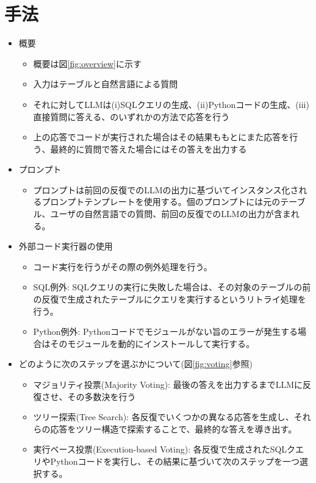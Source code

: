 \documentclass[dvipdfmx,uplatex]{jsarticle}
\theoremstyle{remark}
\newenvironment{method}[1]{
    \begin{tcolorbox}[
        colframe=green!50!black,
        colback=green!50!black!10!white,
        colbacktitle=green!50!black!40!white,
        coltitle=black,
        fonttitle=\bfseries,
        title={#1}
    ]
}{
    \end{tcolorbox}
}
\begin{document}
\section{手法}
\begin{method}{ReAcTable}
\begin{itemize}
    \item 概要
    \begin{itemize}
        \item 概要は図\ref{fig:overview}に示す
        \item 入力はテーブルと自然言語による質問
        \item それに対してLLMは(i)SQLクエリの生成、(ii)Pythonコードの生成、(iii)直接質問に答える、のいずれかの方法で応答を行う
        \item 上の応答でコードが実行された場合はその結果ももとにまた応答を行う、最終的に質問で答えた場合にはその答えを出力する
    \end{itemize}
    \item プロンプト
    \begin{itemize}
        \item プロンプトは前回の反復でのLLMの出力に基づいてインスタンス化されるプロンプトテンプレートを使用する。個のプロンプトには元のテーブル、ユーザの自然言語での質問、前回の反復でのLLMの出力が含まれる。
    \end{itemize}
    \item 外部コード実行器の使用
    \begin{itemize}
        \item コード実行を行うがその際の例外処理を行う。
        \item SQL例外: SQLクエリの実行に失敗した場合は、その対象のテーブルの前の反復で生成されたテーブルにクエリを実行するというリトライ処理を行う。
        \item Python例外: Pythonコードでモジュールがない旨のエラーが発生する場合はそのモジュールを動的にインストールして実行する。 
    \end{itemize}
    \item どのように次のステップを選ぶかについて(図\ref{fig:voting}参照)
    \begin{itemize}
        \item マジョリティ投票(Majority Voting): 最後の答えを出力するまでLLMに反復させ、その多数決を行う
        \item ツリー探索(Tree Search): 各反復でいくつかの異なる応答を生成し、それらの応答をツリー構造で探索することで、最終的な答えを導き出す。
        \item 実行ベース投票(Execution-based Voting): 各反復で生成されたSQLクエリやPythonコードを実行し、その結果に基づいて次のステップを一つ選択する。
    \end{itemize}
\end{itemize}
\end{method}
\end{document}

